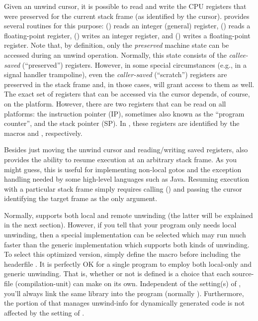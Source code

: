 \documentclass{article}
\begin{document}
Given an unwind cursor, it is possible to read and write the CPU
registers that were preserved for the current stack frame (as
identified by the cursor).   provides several routines
for this purpose: () reads an integer (general)
register, () reads a floating-point register,
() writes an integer register, and
() writes a floating-point register.  Note that,
by definition, only the \emph{preserved} machine state can be accessed
during an unwind operation.  Normally, this state consists of the
\emph{callee-saved} (``preserved'') registers.  However, in some
special circumstances (e.g., in a signal handler trampoline), even the
\emph{caller-saved} (``scratch'') registers are preserved in the stack
frame and, in those cases,  will grant access to them
as well.  The exact set of registers that can be accessed via the
cursor depends, of course, on the platform.  However, there are two
registers that can be read on all platforms: the instruction pointer
(IP), sometimes also known as the ``program counter'', and the stack
pointer (SP).  In , these registers are identified by
the macros  and ,
respectively.

Besides just moving the unwind cursor and reading/writing saved
registers,  also provides the ability to resume
execution at an arbitrary stack frame.  As you might guess, this is
useful for implementing non-local gotos and the exception handling
needed by some high-level languages such as Java.  Resuming execution
with a particular stack frame simply requires calling
() and passing the cursor identifying the target
frame as the only argument.

Normally,  supports both local and remote unwinding
(the latter will be explained in the next section).  However, if you
tell  that your program only needs local unwinding, then
a special implementation can be selected which may run much faster than
the generic implementation which supports both kinds of unwinding.  To
select this optimized version, simply define the macro
 before including the headerfile
.  It is perfectly OK for a single program to
employ both local-only and generic unwinding.  That is, whether or not
 is defined is a choice that each source-file
(compilation-unit) can make on its own.  Independent of the setting(s)
of , you'll always link the same library into
the program (normally ).  Furthermore, the
portion of  that manages unwind-info for dynamically
generated code is not affected by the setting of
.
\end{document}
